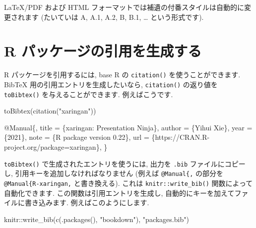 \documentclass[
  11pt,
  lualatex,ja=standard,jafont=noto]{bxjsreport}
\newenvironment{Shaded}{\begin{snugshade}}{\end{snugshade}}
\newcommand{\DataTypeTok}[1]{\textcolor[rgb]{0.13,0.29,0.53}{#1}}
\newcommand{\FunctionTok}[1]{\textcolor[rgb]{0.00,0.00,0.00}{#1}}
\newcommand{\NormalTok}[1]{#1}
\newcommand{\SpecialCharTok}[1]{\textcolor[rgb]{0.00,0.00,0.00}{#1}}
\newcommand{\StringTok}[1]{\textcolor[rgb]{0.31,0.60,0.02}{#1}}
\newcommand{\VariableTok}[1]{\textcolor[rgb]{0.00,0.00,0.00}{#1}}
\begin{document}
LaTeX/PDF および HTML フォーマットでは補遺の付番スタイルは自動的に変更されます (たいていは A, A.1, A.2, B, B.1, \ldots{} という形式です).

\hypertarget{write-bib}{%
\section{R パッケージの引用を生成する}\label{write-bib}}

R パッケージを引用するには, base R の \texttt{citation()} を使うことができます. BibTeX 用の引用エントリを生成したいなら, \texttt{citation()} の返り値を \texttt{toBibtex()} を与えることができます. 例えばこうです.

\begin{Shaded}
\begin{Highlighting}[numbers=left,,]
\FunctionTok{toBibtex}\NormalTok{(}\FunctionTok{citation}\NormalTok{(}\StringTok{"xaringan"}\NormalTok{))}
\end{Highlighting}
\end{Shaded}

\begin{Shaded}
\begin{Highlighting}[]
\VariableTok{@Manual}\NormalTok{\{,}
  \DataTypeTok{title}\NormalTok{ = \{xaringan: Presentation Ninja\},}
  \DataTypeTok{author}\NormalTok{ = \{Yihui Xie\},}
  \DataTypeTok{year}\NormalTok{ = \{2021\},}
  \DataTypeTok{note}\NormalTok{ = \{R package version 0.22\},}
  \DataTypeTok{url}\NormalTok{ = \{https://CRAN.R{-}project.org/package=xaringan\},}
\NormalTok{\}}
\end{Highlighting}
\end{Shaded}

\texttt{toBibtex()} で生成されたエントリを使うには, 出力を \texttt{.bib} ファイルにコピーし, 引用キーを追加しなければなりません (例えば \texttt{@Manual\{,} の部分を \texttt{@Manual\{R-xaringan,} と書き換える). これは \texttt{knitr::write\_bib()} 関数によって自動化できます. この関数は引用エントリを生成し, 自動的にキーを加えてファイルに書き込みます. 例えばこのようにします.

\begin{Shaded}
\begin{Highlighting}[numbers=left,,]
\NormalTok{knitr}\SpecialCharTok{::}\FunctionTok{write\_bib}\NormalTok{(}\FunctionTok{c}\NormalTok{(}\FunctionTok{.packages}\NormalTok{(), }\StringTok{"bookdown"}\NormalTok{), }\StringTok{"packages.bib"}\NormalTok{)}
\end{Highlighting}
\end{Shaded}
\end{document}
